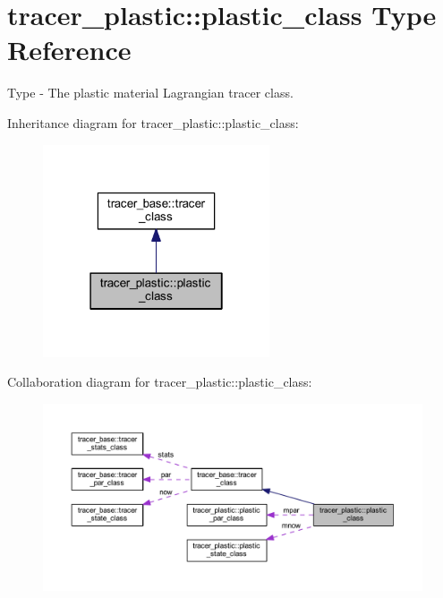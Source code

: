 \hypertarget{structtracer__plastic_1_1plastic__class}{}\section{tracer\+\_\+plastic\+:\+:plastic\+\_\+class Type Reference}
\label{structtracer__plastic_1_1plastic__class}


Type -\/ The plastic material Lagrangian tracer class.  




Inheritance diagram for tracer\+\_\+plastic\+:\+:plastic\+\_\+class\+:\nopagebreak
\begin{figure}[H]
\begin{center}
\leavevmode
\includegraphics[width=190pt]{structtracer__plastic_1_1plastic__class__inherit__graph}
\end{center}
\end{figure}


Collaboration diagram for tracer\+\_\+plastic\+:\+:plastic\+\_\+class\+:\nopagebreak
\begin{figure}[H]
\begin{center}
\leavevmode
\includegraphics[width=350pt]{structtracer__plastic_1_1plastic__class__coll__graph}
\end{center}
\end{figure}
